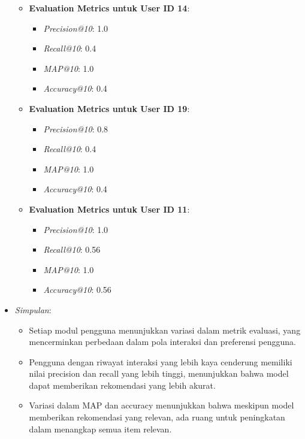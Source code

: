 \documentclass[journal,article,submit,pdftex,moreauthors]{Definitions/mdpi}
\begin{document}
\begin{itemize}
\begin{itemize}
        \item \textbf{Evaluation Metrics untuk User ID 14}:
        \begin{itemize}
            \item \textit{Precision@10}: 1.0
            \item \textit{Recall@10}: 0.4
            \item \textit{MAP@10}: 1.0
            \item \textit{Accuracy@10}: 0.4
        \end{itemize}
        \item \textbf{Evaluation Metrics untuk User ID 19}:
        \begin{itemize}
            \item \textit{Precision@10}: 0.8
            \item \textit{Recall@10}: 0.4
            \item \textit{MAP@10}: 1.0
            \item \textit{Accuracy@10}: 0.4
        \end{itemize}
        \item \textbf{Evaluation Metrics untuk User ID 11}:
        \begin{itemize}
            \item \textit{Precision@10}: 1.0
            \item \textit{Recall@10}: 0.56
            \item \textit{MAP@10}: 1.0
            \item \textit{Accuracy@10}: 0.56
        \end{itemize}
    \end{itemize}
    
    \item \textit{Simpulan}:
    \begin{itemize}
        \item Setiap modul pengguna menunjukkan variasi dalam metrik evaluasi, yang mencerminkan perbedaan dalam pola interaksi dan preferensi pengguna.
        \item Pengguna dengan riwayat interaksi yang lebih kaya cenderung memiliki nilai precision dan recall yang lebih tinggi, menunjukkan bahwa model dapat memberikan rekomendasi yang lebih akurat.
        \item Variasi dalam MAP dan accuracy menunjukkan bahwa meskipun model memberikan rekomendasi yang relevan, ada ruang untuk peningkatan dalam menangkap semua item relevan.
    \end{itemize}

\end{itemize}
\end{document}
